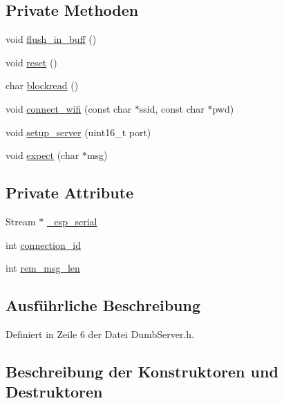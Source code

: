 \subsection*{Private Methoden}
\begin{DoxyCompactItemize}
\item 
void \hyperlink{class_esp_server_a191aa3259094cf1d2c0f22cdfbca9f58}{flush\+\_\+in\+\_\+buff} ()
\item 
void \hyperlink{class_esp_server_aeabfb2610ecfdc26e8ce0e624221067f}{reset} ()
\item 
char \hyperlink{class_esp_server_a3da02efeb5f2cbe3a8a1963e5e7f0a47}{blockread} ()
\item 
void \hyperlink{class_esp_server_a6df2412420218304713dd25715e17198}{connect\+\_\+wifi} (const char $\ast$ssid, const char $\ast$pwd)
\item 
void \hyperlink{class_esp_server_a215752989c25b9819ca06bc8f94845ed}{setup\+\_\+server} (uint16\+\_\+t port)
\item 
void \hyperlink{class_esp_server_a2008f0d315cff00a4bcc1120eeb2dc95}{expect} (char $\ast$msg)
\end{DoxyCompactItemize}
\subsection*{Private Attribute}
\begin{DoxyCompactItemize}
\item 
Stream $\ast$ \hyperlink{class_esp_server_a33166aa92db341d47cdf1776492cca62}{\+\_\+esp\+\_\+serial}
\item 
int \hyperlink{class_esp_server_ab601ba8cdf21497e04e862f22e52c590}{connection\+\_\+id}
\item 
int \hyperlink{class_esp_server_a0cff51089b75a6edf347b86727683e7f}{rem\+\_\+msg\+\_\+len}
\end{DoxyCompactItemize}


\subsection{Ausführliche Beschreibung}


Definiert in Zeile 6 der Datei Dumb\+Server.\+h.



\subsection{Beschreibung der Konstruktoren und Destruktoren}
\mbox{\label{class_esp_server_afcdc76f5ca68d5049657e5d9d971a1c3}} 
